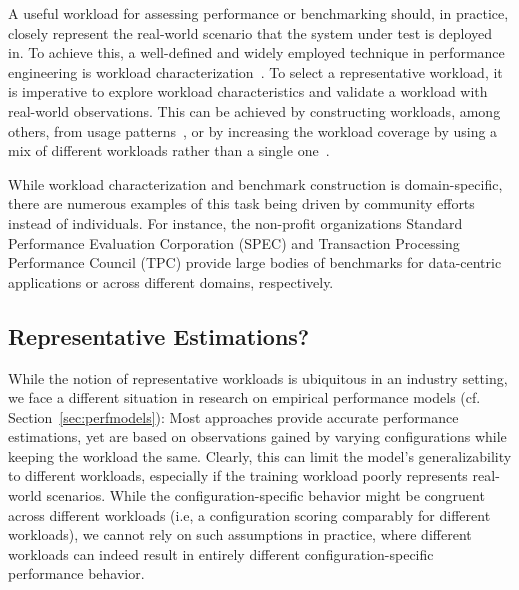 A useful workload for assessing performance or benchmarking should, in practice, closely represent the real-world scenario that the system under test is deployed in. To achieve this, a well-defined and widely employed technique in performance engineering is workload characterization~\cite{ceesay2020,papadopoulos2021}. To select a representative workload, it is imperative to explore workload characteristics and validate a workload with real-world observations. This can be achieved by constructing workloads, among others, from usage patterns~\cite{calzarossa2016}, or by increasing the workload coverage by using a mix of different workloads rather than a single one~\cite{jiang2015survey}.

While workload characterization and benchmark construction is domain-specific, there are numerous examples of this task being driven by community efforts instead of individuals. For instance, the non-profit organizations Standard Performance Evaluation Corporation (SPEC) and Transaction Processing Performance Council (TPC) provide large bodies of benchmarks for data-centric applications or across different domains, respectively.

\subsection{Representative Estimations?}\label{sec:generalizability}
While the notion of representative workloads is ubiquitous in an industry setting, we face a different situation in research on empirical performance models (cf. Section~\ref{sec:perfmodels}): Most approaches provide accurate performance estimations, yet are based on observations gained by varying configurations while keeping the workload the same. Clearly, this can limit the model's generalizability to different workloads, especially if the training workload poorly represents real-world scenarios. While the configuration-specific behavior might be congruent across different workloads (i.e, a configuration scoring comparably for different workloads), we cannot rely on such assumptions in practice, where different workloads can indeed result in entirely different configuration-specific performance behavior.

